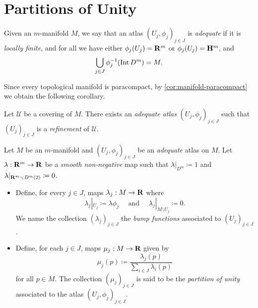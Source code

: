 \section{Partitions of Unity}

\begin{definition}
    \label{def:adequate-atlas}
    Given an \(m\)-manifold \(M\), we say that an atlas
    \((U_j, \phi_j)_{j \in J}\) is \emph{adequate} if it is \emph{locally
        finite}, and for all we have either \(\phi_j(U_j) = \mathbf{R}^m\) or
    \(\phi_j(U_j) = \mathbf{H}^m\), and
    \[
        \bigcup_{j \in J} \phi_j^{-1}(\operatorname{Int} D^m) = M.
    \]
\end{definition}

Since every topological manifold is paracompact, by
\cref{cor:manifold-paracompact} we obtain the following corollary.

\begin{corollary}
    \label{cor:refinement-adequate-atlas}
    Let \(\mathcal{U}\) be a covering of \(M\). There exists an \emph{adequate
        atlas} \((U_j, \phi_j)_{j \in J}\) such that \((U_j)_{j \in J}\) is
    a \emph{refinement} of \(\mathcal{U}\).
\end{corollary}

\begin{definition}
    \label{def:bump-functions-partitions-of-unity}
    Let \(M\) be an \(m\)-manifold and \((U_{j}, \phi_j)_{j \in J}\) be an
    \emph{adequate} atlas on \(M\). Let \(\lambda: \mathbf{R}^m \to \mathbf{R}\) be a \emph{smooth
        non-negative} map such that \(\lambda|_{D^m} \coloneq 1\) and
    \(\lambda|_{\mathbf{R}^m \smallsetminus D^m(2)} \coloneq 0\).
    \begin{itemize}\setlength\itemsep{0em}
        \item Define, for every \(j \in J\), maps \(\lambda_j: M \to \mathbf{R}\) where
              \[
                  \lambda_j|_{U_j} \coloneq \lambda \phi_j
                  \quad\text{ and }\quad
                  \lambda_j|_{M \setminus U_j} \coloneq 0.
              \]
              We name the collection \((\lambda_j)_{j \in J}\) the \emph{bump functions}
              associated to \((U_j)_{j \in J}\).
        \item Define, for each \(j \in J\), maps \(\mu_j: M \to \mathbf{R}\) given by
              \[
                  \mu_j(p) \coloneq \frac{\lambda_j(p)}{\sum_{i \in J} \lambda_i(p)}
              \]
              for all \(p \in M\). The collection \((\mu_j)_{j \in J}\) is said to be the
              \emph{partition of unity} associated to the atlas \((U_j, \phi_j)_{j \in J}\).
    \end{itemize}
\end{definition}


